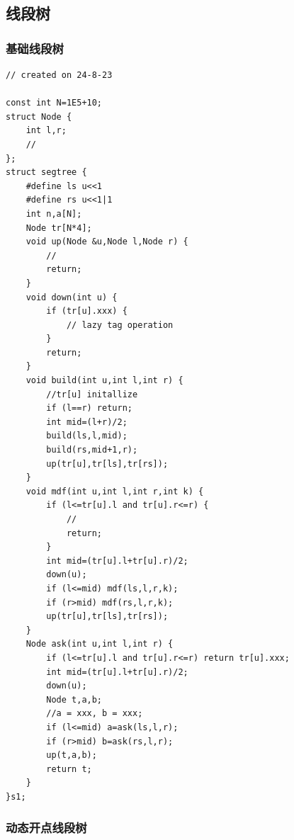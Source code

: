 \documentclass[a4paper,12pt]{article}
\begin{document}
\subsection{线段树}

\subsubsection{基础线段树}

\begin{lstlisting}
// created on 24-8-23

const int N=1E5+10;
struct Node {
    int l,r;
    //
};
struct segtree {
    #define ls u<<1
    #define rs u<<1|1
    int n,a[N];
    Node tr[N*4];
    void up(Node &u,Node l,Node r) {
        //
        return;
    }
    void down(int u) {
        if (tr[u].xxx) {
            // lazy tag operation
        }
        return;
    }
    void build(int u,int l,int r) {
        //tr[u] initallize
        if (l==r) return;
        int mid=(l+r)/2;
        build(ls,l,mid);
        build(rs,mid+1,r);
        up(tr[u],tr[ls],tr[rs]);
    }
    void mdf(int u,int l,int r,int k) {
        if (l<=tr[u].l and tr[u].r<=r) {
            //
            return;
        }
        int mid=(tr[u].l+tr[u].r)/2;
        down(u);
        if (l<=mid) mdf(ls,l,r,k);
        if (r>mid) mdf(rs,l,r,k);
        up(tr[u],tr[ls],tr[rs]);
    }
    Node ask(int u,int l,int r) {
        if (l<=tr[u].l and tr[u].r<=r) return tr[u].xxx;
        int mid=(tr[u].l+tr[u].r)/2;
        down(u);
        Node t,a,b;
        //a = xxx, b = xxx;
        if (l<=mid) a=ask(ls,l,r);
        if (r>mid) b=ask(rs,l,r);
        up(t,a,b);
        return t;
    }
}s1;
\end{lstlisting}

\subsubsection{动态开点线段树}
\end{document}
